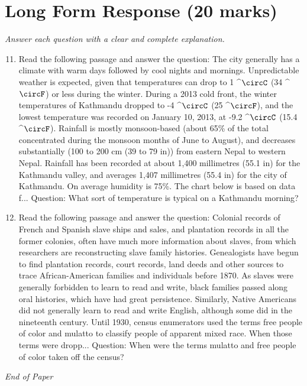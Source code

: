 \documentclass[12pt]{article}
\begin{document}
\section*{Long Form Response (20 marks)}
\textit{Answer each question with a clear and complete explanation.}
\begin{enumerate}[label=\arabic*.]
\setcounter{enumi}{10}
\item Read the following passage and answer the question: The city generally has a climate with warm days followed by cool nights and mornings. Unpredictable weather is expected, given that temperatures can drop to 1 ^\ensuremath{\circC} (34 ^\ensuremath{\circF}) or less during the winter. During a 2013 cold front, the winter temperatures of Kathmandu dropped to -4 ^\ensuremath{\circC} (25 ^\ensuremath{\circF}), and the lowest temperature was recorded on January 10, 2013, at -9.2 ^\ensuremath{\circC} (15.4 ^\ensuremath{\circF}). Rainfall is mostly monsoon-based (about 65\% of the total concentrated during the monsoon months of June to August), and decreases substantially (100 to 200 cm (39 to 79 in)) from eastern Nepal to western Nepal. Rainfall has been recorded at about 1,400 millimetres (55.1 in) for the Kathmandu valley, and averages 1,407 millimetres (55.4 in) for the city of Kathmandu. On average humidity is 75\%. The chart below is based on data f... Question: What sort of temperature is typical on a Kathmandu morning?
\item Read the following passage and answer the question: Colonial records of French and Spanish slave ships and sales, and plantation records in all the former colonies, often have much more information about slaves, from which researchers are reconstructing slave family histories. Genealogists have begun to find plantation records, court records, land deeds and other sources to trace African-American families and individuals before 1870. As slaves were generally forbidden to learn to read and write, black families passed along oral histories, which have had great persistence. Similarly, Native Americans did not generally learn to read and write English, although some did in the nineteenth century. Until 1930, census enumerators used the terms free people of color and mulatto to classify people of apparent mixed race. When those terms were dropp... Question: When were the terms mulatto and free people of color taken off the census?
\end{enumerate}

\vfill
\noindent\textit{End of Paper}
\end{document}
